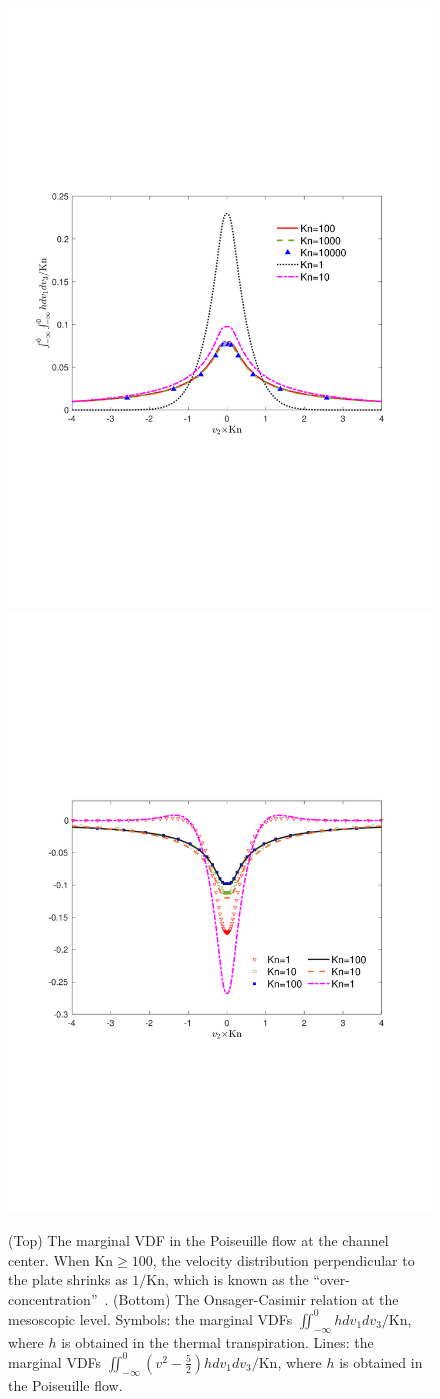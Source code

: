 \begin{figure}[t]
	\centering
	\includegraphics[width=0.6\columnwidth]{LinearizedBol/IMG/poiseuille_mm.pdf}
	\vskip 0.3cm
    \includegraphics[width=0.6\columnwidth]{LinearizedBol/IMG/thermal_VDF}
	\caption{ 
		(Top) The marginal VDF in the Poiseuille flow at the channel center. When $\text{Kn}\ge100$, the velocity distribution perpendicular to the plate shrinks as $1/\text{Kn}$, which is known as the ``over-concentration''~\cite{Takata2011}. (Bottom) 	The Onsager-Casimir relation at the mesoscopic level. Symbols: the marginal VDFs  $\iint_{-\infty}^0{} hdv_1dv_3/\text{Kn}$, where $h$ is obtained in the thermal transpiration. Lines: the marginal VDFs  $\iint_{-\infty}^0{} \left(v^2-\frac{5}{2}\right)hdv_1dv_3/\text{Kn}$, where $h$ is obtained in the Poiseuille flow.
	} 
	\label{Onsager0}
\end{figure}

